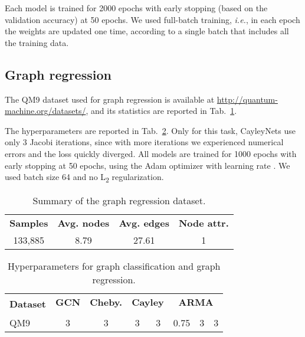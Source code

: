 \documentclass{article}
\begin{document}
Each model is trained for 2000 epochs with early stopping (based on the validation accuracy) at 50 epochs.
We used full-batch training, \emph{i.e.}, in each epoch the weights are updated one time, according to a single batch that includes all the training data. 

\subsection{Graph regression}

The QM9 dataset used for graph regression is available at \url{http://quantum-machine.org/datasets/}, and its statistics are reported in Tab.~\ref{tab:gr_dataset}.

The hyperparameters are reported in Tab.~\ref{tab:hyper_gr}. 
Only for this task, CayleyNets use only 3 Jacobi iterations, since with more iterations we experienced numerical errors and the loss quickly diverged.
All models are trained for 1000 epochs with early stopping at 50 epochs, using the Adam optimizer with learning rate . 
We used batch size 64 and no L\textsubscript{2} regularization.

\bgroup
\def\arraystretch{1.0} \setlength\tabcolsep{.8em} \begin{table}[!ht]
\small
\centering
\caption{Summary of the graph regression dataset.} 
\label{tab:gr_dataset}
\begin{tabular}{cccc}
\cmidrule[1.5pt]{1-4}
\textbf{Samples} & \textbf{Avg. nodes} & \textbf{Avg. edges} & \textbf{Node attr.} \\
\cmidrule[.5pt]{1-4}
133,885 & 8.79 & 27.61 & 1 \\
\cmidrule[1.5pt]{1-4}
\end{tabular}
\end{table}
\egroup

\begin{table}[!ht]
\setlength\tabcolsep{.5em} \small
\centering
\caption{Hyperparameters for graph classification and graph regression.}
\bgroup
\def\arraystretch{1.0} \begin{tabular}{l|c|c|cc|ccc}
\cmidrule[1.5pt]{1-8}
\multirow{ 2}{*}{\textbf{Dataset}} & \textbf{GCN} & \textbf{Cheby.} & \multicolumn{2}{c|}{\textbf{Cayley}} & \multicolumn{3}{c}{\textbf{ARMA}} \\
                                   &  &  &  &  &  &  &  \\
\midrule
QM9      & 3 & 3 & 3 & 3 & 0.75 & 3 & 3 \\
\cmidrule[1.5pt]{1-8}
\end{tabular}
\label{tab:hyper_gr}
\egroup
\end{table}
\end{document}
